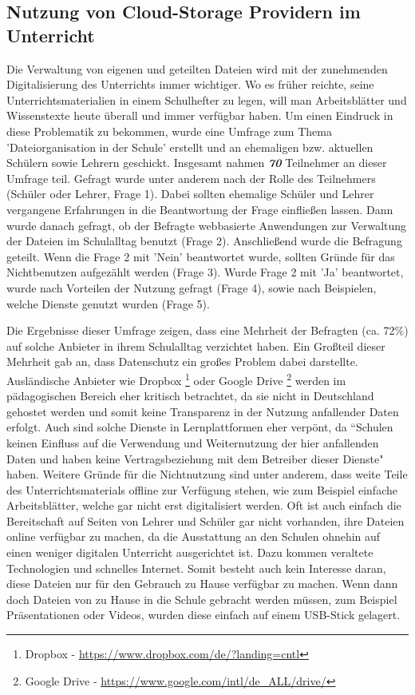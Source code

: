 \subsection{Nutzung von Cloud-Storage Providern im Unterricht}
\label{sec:survey}

Die Verwaltung von eigenen und geteilten Dateien wird mit der zunehmenden Digitalisierung des Unterrichts immer wichtiger. Wo es früher reichte, seine Unterrichtsmaterialien in einem Schulhefter zu legen, will man Arbeitsblätter und Wissenstexte heute überall und immer verfügbar haben. Um einen Eindruck in diese Problematik zu bekommen, wurde eine Umfrage zum Thema 'Dateiorganisation in der Schule' \cite{survey:umfragedateiorganisation} erstellt und an ehemaligen bzw. aktuellen Schülern sowie Lehrern geschickt. Insgesamt nahmen \textbf{\textit{70}}  Teilnehmer  an dieser Umfrage teil. Gefragt wurde unter anderem nach der Rolle des Teilnehmers (Schüler oder Lehrer, Frage 1). Dabei sollten ehemalige Schüler und Lehrer vergangene Erfahrungen in die Beantwortung der Frage einfließen lassen. Dann wurde danach gefragt, ob der Befragte webbasierte Anwendungen zur Verwaltung der Dateien im Schulalltag benutzt (Frage 2). Anschließend wurde die Befragung geteilt. Wenn die Frage 2 mit 'Nein' beantwortet wurde, sollten Gründe für das Nichtbenutzen aufgezählt werden (Frage 3). Wurde Frage 2 mit 'Ja' beantwortet, wurde nach Vorteilen der Nutzung gefragt (Frage 4), sowie nach Beispielen, welche Dienste genutzt wurden (Frage 5). 

Die Ergebnisse \cite{survey:umfragedateiorganisationergebnisse} dieser Umfrage zeigen, dass eine Mehrheit der Befragten (ca. 72\%) auf solche Anbieter in ihrem Schulalltag verzichtet haben. Ein Großteil dieser Mehrheit gab an, dass Datenschutz ein großes Problem dabei darstellte. Ausländische Anbieter wie Dropbox \footnote{Dropbox - \url{https://www.dropbox.com/de/?landing=cntl}} oder Google Drive \footnote{Google Drive - \url{https://www.google.com/intl/de_ALL/drive/}} werden im pädagogischen Bereich eher kritisch betrachtet, da sie nicht in Deutschland gehostet werden und somit keine Transparenz in der Nutzung anfallender Daten erfolgt. Auch sind solche Dienste in Lernplattformen eher verpönt, da ``Schulen keinen Einfluss auf die Verwendung und Weiternutzung der hier anfallenden Daten und haben keine Vertragsbeziehung mit dem Betreiber dieser Dienste" \cite{online:itslearningmythenundfakten} haben. Weitere Gründe für die Nichtnutzung sind unter anderem, dass weite Teile des Unterrichtsmaterials offline zur Verfügung stehen, wie zum Beispiel einfache Arbeitsblätter, welche gar nicht erst digitalisiert werden. Oft ist auch einfach die Bereitschaft auf Seiten von Lehrer und Schüler gar nicht vorhanden, ihre Dateien online verfügbar zu machen, da die Ausstattung an den Schulen ohnehin auf einen weniger digitalen Unterricht ausgerichtet ist. Dazu kommen veraltete Technologien und schnelles Internet. Somit besteht auch kein Interesse daran, diese Dateien nur für den Gebrauch zu Hause verfügbar zu machen. Wenn dann doch Dateien von zu Hause in die Schule gebracht werden müssen, zum Beispiel Präsentationen oder Videos, wurden diese einfach auf einem USB-Stick gelagert.

